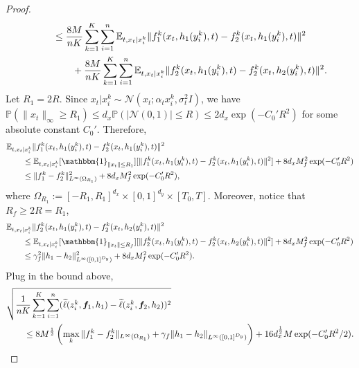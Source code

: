 \documentclass[11pt]{article}
\numberwithin{equation}{section}
\renewcommand{\P}{\mathbb{P}}
\begin{document}
\begin{proof}
\begin{equation}
\begin{aligned}
            &\qquad\leq \frac{8M}{nK}\sum_{k=1}^K\sum_{i=1}^n \mathbb{E}_{t,x_t|x_i^k}\|f_1^k(x_t,h_1(y_i^k),t)-f_2^k(x_t,h_1(y_i^k),t)\|^2 \\
            &\qquad\qquad + \frac{8M}{nK}\sum_{k=1}^K\sum_{i=1}^n \mathbb{E}_{t,x_t|x_i^k}\|f_2^k(x_t,h_1(y_i^k),t)-f_2^k(x_t,h_2(y_i^k),t)\|^2.
        \end{aligned}
    \end{equation}
    Let $R_1=2R$. Since $x_t|x_i^k\sim\mathcal{N}(x_t;\alpha_tx_i^k,\sigma_t^2I)$, we have $\P(\|x_t\|_\infty\geq R_1)\leq d_x\P(|\mathcal{N}(0,1)|\leq R)\leq 2d_x\exp(-C_0'R^2)$ for some absolute constant $C_0'$.
    Therefore,
    \begin{equation}
        \begin{aligned}
            &\E_{t,x_t|x_i^k}\|f_1^k(x_t,h_1(y_i^k),t)-f_2^k(x_t,h_1(y_i^k),t)\|^2 \\
            &\qquad \leq \E_{t,x_t|x_i^k}[\mathbbm{1}_{\|x_t\|\leq R_1}] [\|f_1^k(x_t,h_1(y_i^k),t)-f_2^k(x_t,h_1(y_i^k),t)\|^2] + 8d_xM_f^2\exp(-C_0'R^2) \\
            &\qquad \leq \|f_1^k-f_2^k\|^2_{L^\infty(\Omega_{R_1})} + 8d_xM_f^2\exp(-C_0'R^2),
        \end{aligned}
    \end{equation}
    where $\Omega_{R_1}:=[-R_1,R_1]^{d_x}\times[0,1]^{d_y}\times[T_0,T]$. 
    Moreover, notice that $R_f\geq 2R=R_1$,
    \begin{equation}
        \begin{aligned}
            &\E_{t,x_t|x_i^k}\|f_2^k(x_t,h_1(y_i^k),t)-f_2^k(x_t,h_2(y_i^k),t)\|^2 \\
            &\qquad \leq \E_{t,x_t|x_i^k}[\mathbbm{1}_{\|x_t\|\leq R_f}] [\|f_2^k(x_t,h_1(y_i^k),t)-f_2^k(x_t,h_2(y_i^k),t)\|^2] + 8d_xM_f^2\exp(-C_0'R^2) \\
            &\qquad \leq \gamma_f^2\|h_1-h_2\|^2_{L^\infty([0,1]^{D_y})} + 8d_xM_f^2\exp(-C_0'R^2).
        \end{aligned}
    \end{equation}
    Plug in the bound above,
    \begin{equation}
        \begin{aligned}
            &\sqrt{\frac{1}{nK}\sum_{k=1}^K\sum_{i=1}^n(\widetilde{\ell}(z_i^k,\vf_1,h_1)-\widetilde{\ell}(z_i^k,\vf_2,h_2))^2} \\
            &\qquad \leq 8M^{\frac{1}{2}}\left(\max_k\|f_1^k-f_2^k\|_{L^\infty(\Omega_{R_1})}+\gamma_f\|h_1-h_2\|_{L^\infty([0,1]^{D_y})}\right) + 16d_x^{\frac{1}{2}}M\exp(-C_0'R^2/2).

\end{aligned}
\end{equation}
\end{proof}
\end{document}

